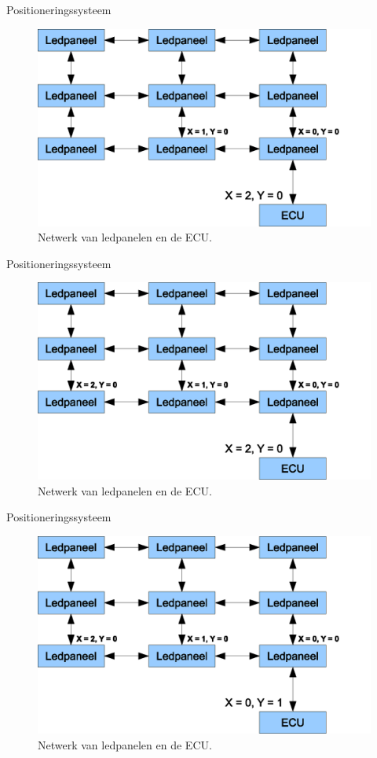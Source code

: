 \begin{frame}{Positioneringssysteem}
	\begin{figure}[h]
		\centering
		\includegraphics[width=12cm]{animatie/2}
		\caption{Netwerk van ledpanelen en de ECU.}
	\end{figure}
\end{frame}

\begin{frame}{Positioneringssysteem}
	\begin{figure}[h]
		\centering
		\includegraphics[width=12cm]{animatie/3}
		\caption{Netwerk van ledpanelen en de ECU.}
	\end{figure}
\end{frame}

\begin{frame}{Positioneringssysteem}
	\begin{figure}[h]
		\centering
		\includegraphics[width=12cm]{animatie/4}
		\caption{Netwerk van ledpanelen en de ECU.}
	\end{figure}
\end{frame}

